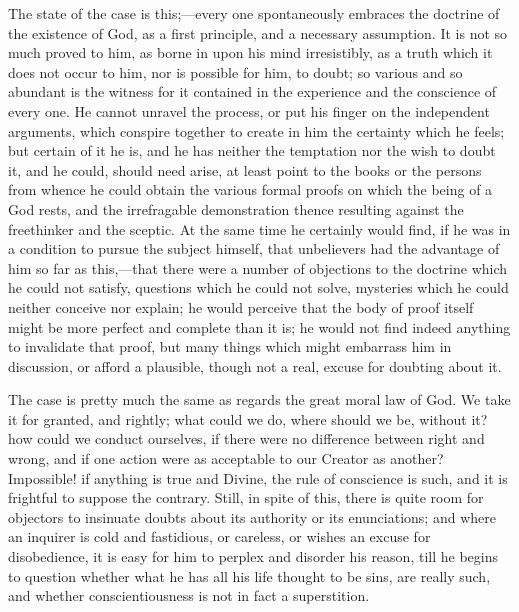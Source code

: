 The state of the case is this;—every one spontaneously embraces
the doctrine of the existence of God, as a first principle, and a
necessary assumption. It is not so much proved to him, as borne in
upon his mind irresistibly, as a truth which it does not occur to him,
nor is possible for him, to doubt; so various and so abundant is the
witness for it contained in the experience and the conscience of every
one. He cannot unravel the process, or put his finger on the
independent arguments, which conspire together to create in him the
certainty which he feels; but certain of it he is, and he has neither
the temptation nor the wish to doubt it, and he could, should need
arise, at least point to the books or the persons from whence he could
obtain the various formal proofs on which the being of a God rests,
and the irrefragable demonstration thence resulting against the
freethinker and the sceptic. At the same time he certainly would find,
if he was in a condition to pursue the subject himself, that
unbelievers had the advantage of him so far as this,—that there were
a number of objections to the doctrine which he could not satisfy,
questions which he could not solve, mysteries which he could neither
conceive nor explain; he would perceive that the body of proof itself
might be more perfect and complete than it is; he would not find
indeed anything to invalidate that proof, but many things which might
embarrass him in discussion, or afford a plausible, though not a real,
excuse for doubting about it.

The case is pretty much the same as regards the great moral law of
God. We take it for granted, and rightly; what could we do, where
should we be, without it? how could we conduct ourselves, if there
were no difference between right and wrong, and if one action were as
acceptable to our Creator as another? Impossible! if anything is true
and Divine, the rule of conscience is such, and it is frightful to
suppose the contrary. Still, in spite of this, there is quite room
for objectors to insinuate doubts about its authority or its
enunciations; and where an inquirer is cold and fastidious, or
careless, or wishes an excuse for disobedience, it is easy for him to
perplex and disorder his reason, till he begins to question whether
what he has all his life thought to be sins, are really such, and
whether conscientiousness is not in fact a superstition.

